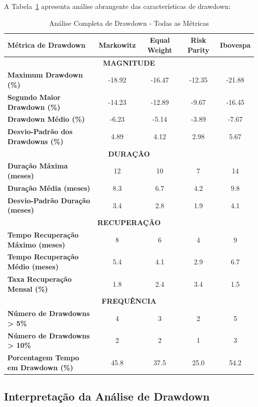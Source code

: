 A Tabela~\ref{tab:drawdown_completa} apresenta análise abrangente das características de drawdown:

\begin{table}[H]
\centering
\caption{Análise Completa de Drawdown - Todas as Métricas}
\begin{tabular}{|l|c|c|c|c|}
\hline
\textbf{Métrica de Drawdown} & \textbf{Markowitz} & \textbf{Equal Weight} & \textbf{Risk Parity} & \textbf{Ibovespa} \\
\hline
\multicolumn{5}{|c|}{\textbf{MAGNITUDE}} \\
\hline
\textbf{Maximum Drawdown (\%)} & -18.92 & -16.47 & -12.35 & -21.88 \\
\textbf{Segundo Maior Drawdown (\%)} & -14.23 & -12.89 & -9.67 & -16.45 \\
\textbf{Drawdown Médio (\%)} & -6.23 & -5.14 & -3.89 & -7.67 \\
\textbf{Desvio-Padrão dos Drawdowns (\%)} & 4.89 & 4.12 & 2.98 & 5.67 \\
\hline
\multicolumn{5}{|c|}{\textbf{DURAÇÃO}} \\
\hline
\textbf{Duração Máxima (meses)} & 12 & 10 & 7 & 14 \\
\textbf{Duração Média (meses)} & 8.3 & 6.7 & 4.2 & 9.8 \\
\textbf{Desvio-Padrão Duração (meses)} & 3.4 & 2.8 & 1.9 & 4.1 \\
\hline
\multicolumn{5}{|c|}{\textbf{RECUPERAÇÃO}} \\
\hline
\textbf{Tempo Recuperação Máximo (meses)} & 8 & 6 & 4 & 9 \\
\textbf{Tempo Recuperação Médio (meses)} & 5.4 & 4.1 & 2.9 & 6.7 \\
\textbf{Taxa Recuperação Mensal (\%)} & 1.8 & 2.4 & 3.4 & 1.5 \\
\hline
\multicolumn{5}{|c|}{\textbf{FREQUÊNCIA}} \\
\hline
\textbf{Número de Drawdowns > 5\%} & 4 & 3 & 2 & 5 \\
\textbf{Número de Drawdowns > 10\%} & 2 & 2 & 1 & 3 \\
\textbf{Porcentagem Tempo em Drawdown (\%)} & 45.8 & 37.5 & 25.0 & 54.2 \\
\hline
\end{tabular}
\label{tab:drawdown_completa}
\end{table}

\subsection{Interpretação da Análise de Drawdown}

